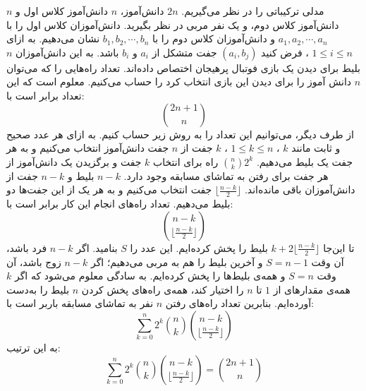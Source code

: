 \p
مدلی ترکیباتی را در نظر می‌گیریم.
$2n$
دانش‌آموز،
$n$
دانش‌آموز کلاس اول و
$n$
دانش‌آموز کلاس دوم، و یک نفر مربی در نظر بگیرید. دانش‌آموزان کلاس اول را با
$a_1, a_2, \cdots, a_n$
و دانش‌آموزان کلاس دوم را با
$b_1, b_2, \cdots, b_n$
نشان می‌دهیم. به ازای
$1 \leq i \leq n$
، فرض کنید
$(a_i, b_j)$
جفت متشکل از
$a_i$
و
$b_i$
باشد. به این دانش‌آموزان
$n$
بلیط برای دیدن یک بازی فوتبال پرهیجان اختصاص داده‌اند. تعداد راه‌هایی را که می‌توان
$n$
دانش آموز را برای دیدن این بازی انتخاب کرد را حساب می‌کنیم. معلوم است که این تعداد برابر است با:
$$\binom{2n + 1}{n}$$
از طرف دیگر، می‌توانیم این تعداد را به روش زیر حساب کنیم. به ازای هر عدد صحیح و ثابت مانند
$k$
،
$1 \leq k \leq n$
،
$k$
جفت از
$n$
جفت دانش‌آموز انتخاب می‌کنیم و به هر جفت یک بلیط می‌دهیم.
$\binom{n}{k}2^k$
راه برای انتخاب
$k$
جفت و برگزیدن یک دانش‌آموز از هر جفت برای رفتن به تماشای مسابقه وجود دارد.
$n - k$
بلیط و
$n - k$
جفت از دانش‌آموزان باقی مانده‌اند.
$\lfloor \frac{n - k}{2} \rfloor$
جفت انتخاب می‌کنیم و به هر یک از این جفت‌ها دو بلیط می‌دهیم. تعداد راه‌های انجام این کار برابر است با:
$$\binom{n - k}{\lfloor \frac{n - k}{2} \rfloor}$$
تا این‌جا
$k + 2\lfloor \frac{n - k}{2} \rfloor$
بلیط را پخش کرده‌ایم. این عدد را
$S$
بنامید. اگر
$n  - k$
فرد باشد، آن وقت
$S = n - 1$
و آخرین بلیط را هم به مربی می‌دهیم؛ اگر
$n  - k$
زوج باشد، آن وقت
$S = n$
و همه‌ی بلیط‌ها را پخش کرده‌ایم. به سادگی معلوم می‌شود که اگر
$k$
همه‌ی مقدارهای از
$1$
تا
$n$
را اختیار کند، همه‌ی راه‌های پخش کردن
$n$
بلیط را به‌دست آورده‌ایم. بنابرین تعداد راه‌های رفتن
$n$
نفر به تماشای مسابقه باربر است با:
$$\sum_{k=0}^{n} 2^k \binom{n}{k} \binom{n - k}{\lfloor \frac{n-k}{2} \rfloor}$$
به این ترتیب:
$$\sum_{k=0}^{n} 2^k \binom{n}{k} \binom{n - k}{\lfloor \frac{n-k}{2} \rfloor}  = \binom{2n + 1}{n}$$

